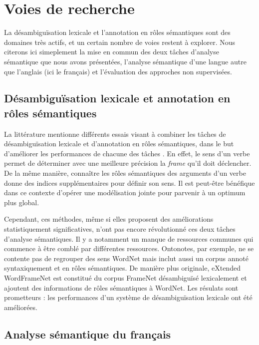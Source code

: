\section{Voies de recherche}

La désambiguïsation lexicale et l'annotation en rôles sémantiques sont des domaines très actifs, et un certain nombre de voies restent à explorer. Nous citerons ici simeplement la mise en commun des deux tâches d'analyse sémantique que nous avons présentées, l'analyse sémantique d'une langue autre que l'anglais (ici le français) et l'évaluation des approches non supervisées.

\subsection{Désambiguïsation lexicale et annotation en rôles sémantiques}

La littérature mentionne différents essais visant à combiner les tâches de désambiguïsation lexicale et d'annotation en rôles sémantiques, dans le but d'améliorer les performances de chacune des tâches \citep{dang2005role,moreda2006role,che2010jointly}. En effet, le sens d'un verbe permet de déterminer avec une meilleure précision la \textit{frame} qu'il doit déclencher. De la même manière, connaître les rôles sémantiques des arguments d'un verbe donne des indices supplémentaires pour définir son sens. Il est peut-être bénéfique dans ce contexte d'opérer une modélisation jointe pour parvenir à un optimum plus global.

Cependant, ces méthodes, même si elles proposent des améliorations statistiquement significatives, n'ont pas encore révolutionné ces deux tâches d'analyse sémantiques. Il y a notamment un manque de ressources communes qui commence à être comblé par différentes ressources. Ontonotes, par exemple, ne se contente pas de regrouper des sens WordNet mais inclut aussi un corpus annoté syntaxiquement et en rôles sémantiques. De manière plus originale, eXtended WordFrameNet \citep{laparra2010extended} est constitué du corpus FrameNet désambiguïsé lexicalement et ajoutent des informations de rôles sémantiques à WordNet. Les résulats sont prometteurs : les performances d'un système de désambiguïsation lexicale ont été améliorées.

\subsection{Analyse sémantique du français}


